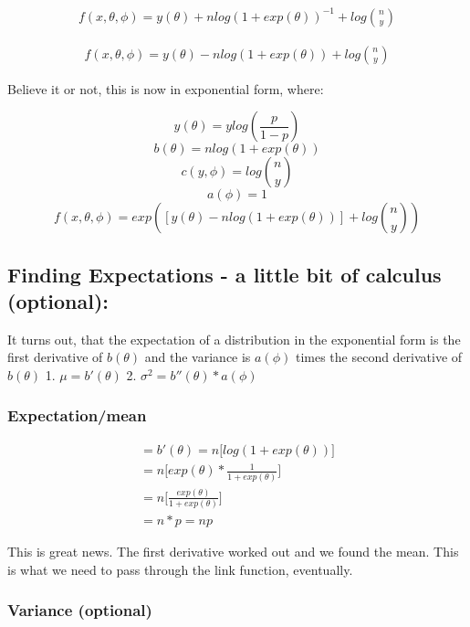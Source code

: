 \documentclass[
]{article}
\begin{document}
\begin{align}
\tag{10a}
f(x, \theta, \phi)=y(\theta) + nlog(1+exp(\theta))^{-1} + log{n\choose y} 
\end{align}

\begin{align}
\tag{10b}
f(x, \theta, \phi)=y(\theta) - nlog(1+exp(\theta)) + log{n\choose y}
\end{align}

Believe it or not, this is now in exponential form, where:

\[y(\theta) = ylog(\frac{p}{1-p})\] \[b(\theta) = nlog(1+exp(\theta))\]
\[c(y, \phi) = log{n\choose y}\] \[a(\phi)=1\]
\[f(x, \theta, \phi)=exp([y(\theta) - nlog(1+exp(\theta))] + log{n\choose y})\]

\hypertarget{finding-expectations---a-little-bit-of-calculus-optional}{%
\subsection{Finding Expectations - a little bit of calculus
(optional):}\label{finding-expectations---a-little-bit-of-calculus-optional}}

It turns out, that the expectation of a distribution in the exponential
form is the first derivative of \(b(\theta)\) and the variance is
\(a(\phi)\) times the second derivative of \(b(\theta)\) 1.
\(\mu = b'(\theta)\) 2. \(\sigma^2 = b''(\theta)*a(\phi)\)

\hypertarget{expectationmean}{%
\subsubsection{Expectation/mean}\label{expectationmean}}

\begin{align}
=b'(\theta) = n\biggl[log(1+exp(\theta))\biggr] \\
=n\bigg[exp(\theta)*\frac{1}{1+exp(\theta)}\bigg] \\
=n\bigg[\frac{exp(\theta)}{1+exp(\theta)}\bigg] \\
= n*p =np
\end{align}

This is great news. The first derivative worked out and we found the
mean. This is what we need to pass through the link function,
eventually.

\hypertarget{variance-optional}{%
\subsubsection{Variance (optional)}\label{variance-optional}}
\end{document}
